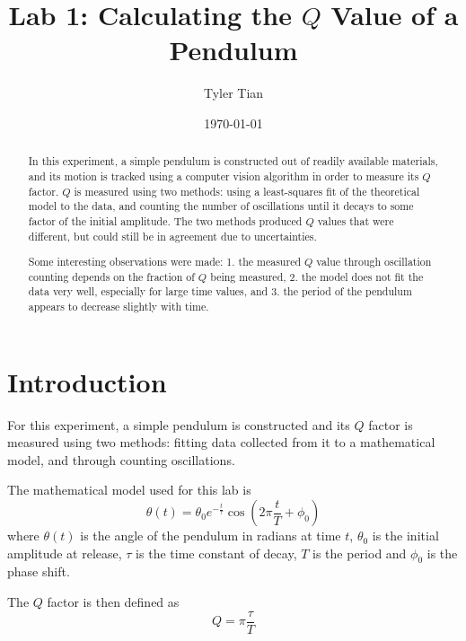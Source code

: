 \documentclass[aps,twocolumn,secnumarabic,nobalancelastpage,amsmath,amssymb,nofootinbib,letterpaper]{revtex4}
\begin{document}
\title{Lab 1: Calculating the \(Q\) Value of a Pendulum}
\author{Tyler Tian}
\noaffiliation
\date{\today}


\begin{abstract}
In this experiment, a simple pendulum is constructed out of readily available materials, and its motion is tracked using
a computer vision algorithm in order to measure its \(Q\) factor. \(Q\) is measured using two methods: using a
least-squares fit of the theoretical model to the data, and counting the number of oscillations until it decays to some
factor of the initial amplitude. The two methods produced \(Q\) values that were different, but could still be in
agreement due to uncertainties.

Some interesting observations were made: 1. the measured \(Q\) value through oscillation counting depends on the
fraction of \(Q\) being measured, 2. the model does not fit the data very well, especially for large time values, and 3.
the period of the pendulum appears to decrease slightly with time.
\end{abstract}

\maketitle


\section{Introduction}

For this experiment, a simple pendulum is constructed and its \(Q\) factor is measured using two methods:
fitting data collected from it to a mathematical model, and through counting oscillations.

The mathematical model used for this lab is
\begin{equation}
    \theta(t) = \theta_0 e^{-\frac{t}{\tau}}\cos\left(2\pi\frac{t}{T} + \phi_0\right)
    \label{eqn:model}
\end{equation}
where $\theta(t)$ is the angle of the pendulum in radians at time $t$, $\theta_0$ is the initial amplitude at release,
$\tau$ is the time constant of decay, $T$ is the period and $\phi_0$ is the phase shift.

The \(Q\) factor is then defined as
\begin{equation}
    Q = \pi\frac{\tau}{T}
    \label{eqn:q}
\end{equation}
\end{document}
